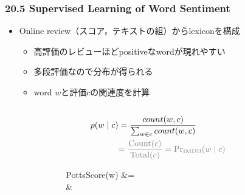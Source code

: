 
\begin{frame}
    \frametitle{20.5 Supervised Learning of Word Sentiment}
    \begin{itemize}
        \item Online review（スコア，テキストの組）からlexiconを構成
        \begin{itemize}
            \item 高評価のレビューほどpositiveなwordが現れやすい
            \item 多段評価なので分布が得られる
            \item word $w$と評価$c$の関連度を計算
        \end{itemize}
    \end{itemize}
    \begin{columns}
        \begin{column}[T]{0.05\textwidth}
            \relax
        \end{column}
        \begin{column}[T]{0.45\textwidth}
            \footnotesize
            \begin{align*}
                p(w \mid c) &= \frac{count(w, c)}{\sum_{w \in c} count(w, c)} \\
                &\ygraytxt{= \frac{\mathrm{Count}(c)}{\mathrm{Total}(c)} = \mathrm{Pr}_{\mathrm{IMDB}}(w \mid c)}
            \end{align*}
            \begin{yalign*}
                PottsScore(w) &=  \\
                &
            \end{yalign*}
        \end{column}
        \begin{column}[T]{0.45\textwidth}
        \end{column}
    \end{columns}
\end{frame}


